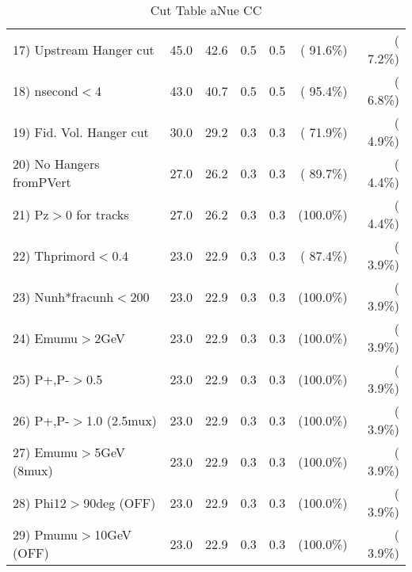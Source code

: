 \begin{table}[h!]
\begin{tabular}{||l||r|r|r|r|r|r||}
 17) Upstream Hanger cut  &         45.0 &         42.6 &          0.5 &          0.5 & ( 91.6\%) & (  7.2\%) \\
 18) nsecond$<$4          &         43.0 &         40.7 &          0.5 &          0.5 & ( 95.4\%) & (  6.8\%) \\
 19) Fid. Vol. Hanger cut &         30.0 &         29.2 &          0.3 &          0.3 & ( 71.9\%) & (  4.9\%) \\
 20) No Hangers fromPVert &         27.0 &         26.2 &          0.3 &          0.3 & ( 89.7\%) & (  4.4\%) \\
 21) Pz$>$0 for tracks    &         27.0 &         26.2 &          0.3 &          0.3 & (100.0\%) & (  4.4\%) \\
 22) Thprimord$<$0.4      &         23.0 &         22.9 &          0.3 &          0.3 & ( 87.4\%) & (  3.9\%) \\
 23) Nunh*fracunh$<$200   &         23.0 &         22.9 &          0.3 &          0.3 & (100.0\%) & (  3.9\%) \\
 24) Emumu$>$2GeV         &         23.0 &         22.9 &          0.3 &          0.3 & (100.0\%) & (  3.9\%) \\
 25) P+,P-$>$0.5          &         23.0 &         22.9 &          0.3 &          0.3 & (100.0\%) & (  3.9\%) \\
 26) P+,P-$>$1.0 (2.5mux) &         23.0 &         22.9 &          0.3 &          0.3 & (100.0\%) & (  3.9\%) \\
 27) Emumu$>$5GeV  (8mux) &         23.0 &         22.9 &          0.3 &          0.3 & (100.0\%) & (  3.9\%) \\
 28) Phi12$>$90deg  (OFF) &         23.0 &         22.9 &          0.3 &          0.3 & (100.0\%) & (  3.9\%) \\
 29) Pmumu$>$10GeV  (OFF) &         23.0 &         22.9 &          0.3 &          0.3 & (100.0\%) & (  3.9\%) \\
 \hline
 \hline
 \end{tabular}
 \caption{Cut Table  aNue CC  }
 \label{tab-cutcohjpsi-mumu_anuecc}
 \end{table}
